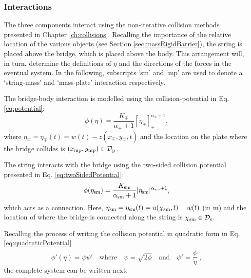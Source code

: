 \subsubsection{Interactions}
The three components interact using the non-iterative collision methods presented in Chapter \ref{ch:collisions}. Recalling the importance of the relative location of the various objects (see Section \ref{sec:massRigidBarrier}), the string is placed above the bridge, which is placed above the body. This arrangement will, in turn, determine the definitions of $\eta$ and the directions of the forces in the eventual system. In the following, subscripts `sm' and `mp' are used to denote a `string-mass' and `mass-plate' interaction respectively.

The bridge-body interaction is modelled using the collision-potential in Eq. \eqref{eq:potential}:
\begin{equation}
    \phi(\eta) = \frac{K_\mp}{\alpha_\mp+1}[\eta_\mp]_+^{\alpha_\mp+1},
\end{equation}
where $\eta_\mp = \eta_\mp(t) = w(t) - z(x_\mp, y_\mp, t)$ and the location on the plate where the bridge collides is $(x_{\text{mp}}, y_{\text{mp}})\in \mathcal{D}_{\text{p}}$. 

The string interacts with the bridge using the two-sided collision potential presented in Eq. \eqref{eq:twoSidedPotential}:
\begin{equation}\label{eq:stringMassPotential}
    \phi(\eta_{\text{sm}}) = \frac{K_{\text{sm}}}{\alpha_{\text{sm}}+1}|\eta_{\text{sm}}|^{\alpha_{\text{sm}}+1},
\end{equation}
which acts as a connection.  Here, $\eta_{\text{sm}} = \eta_{\text{sm}}(t) = u(\chi_{\text{sm}}, t) - w(t)$ (in m) and the location of where the bridge is connected along the string is $\chi_{\text{sm}} \in \mathcal{D}_{\text{s}}$. 

Recalling the process of writing the collision potential in quadratic form in Eq. \eqref{eq:quadraticPotential}
\begin{equation}\label{eq:quadraticPotentialTromba}
    \phi'(\eta) = \psi\psi' \quad \text{where} \quad \psi = \sqrt{2\phi} \quad \text{and} \quad \psi' = \frac{\dot{\psi}}{\dot{\eta}}\ ,
\end{equation}
the complete system can be written next.

